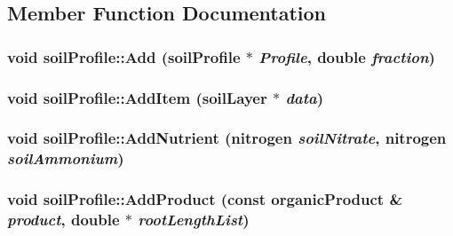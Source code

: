\subsection{Member Function Documentation}
\hypertarget{classsoil_profile_a7fd5e793b56ea8fbc1aeb79e1927565e}{
\subsubsection[{Add}]{\setlength{\rightskip}{0pt plus 5cm}void soilProfile::Add ({\bf soilProfile} $\ast$ {\em Profile}, \/  double {\em fraction})}}
\label{classsoil_profile_a7fd5e793b56ea8fbc1aeb79e1927565e}
\hypertarget{classsoil_profile_a92dfd951458d1d150e642f35e135f4b3}{
\subsubsection[{AddItem}]{\setlength{\rightskip}{0pt plus 5cm}void soilProfile::AddItem ({\bf soilLayer} $\ast$ {\em data})}}
\label{classsoil_profile_a92dfd951458d1d150e642f35e135f4b3}
\hypertarget{classsoil_profile_aabd57b1bc75b4960731ed99fb01adba5}{
\subsubsection[{AddNutrient}]{\setlength{\rightskip}{0pt plus 5cm}void soilProfile::AddNutrient ({\bf nitrogen} {\em soilNitrate}, \/  {\bf nitrogen} {\em soilAmmonium})}}
\label{classsoil_profile_aabd57b1bc75b4960731ed99fb01adba5}
\hypertarget{classsoil_profile_a626f77b25f2ebf34e48b46fbc4c27088}{
\subsubsection[{AddProduct}]{\setlength{\rightskip}{0pt plus 5cm}void soilProfile::AddProduct (const {\bf organicProduct} \& {\em product}, \/  double $\ast$ {\em rootLengthList})}}

